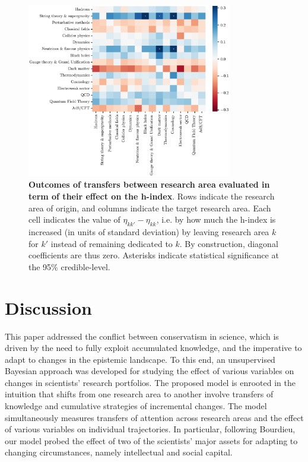 \documentclass{article}
\begin{document}
\begin{figure}[h]
    \centering
    \includegraphics[width=0.8\textwidth]{plots/outcomes_rho.eps}
    \caption{\textbf{Outcomes of transfers between research area evaluated in term of their effect on the h-index}. Rows indicate the research area of origin, and columns indicate the target research area. Each cell indicates the value of $\eta_{kk'}-\eta_{kk}$, i.e. by how much the h-index is increased (in units of standard deviation) by leaving research area $k$ for $k'$ instead of remaining dedicated to $k$. By construction, diagonal coefficients are thus zero. Asterisks indicate statistical significance at the 95\% credible-level. }
    \label{fig:outcomes_rho}
\end{figure}

\section{Discussion}

This paper addressed the conflict between conservatism in science, which is driven by the need to fully exploit accumulated knowledge, and the imperative to adapt to changes in the epistemic landscape. To this end, an unsupervised Bayesian approach was developed for studying the effect of various variables on changes in scientists' research portfolios. The proposed model is enrooted in the intuition that shifts from one research area to another involve transfers of knowledge and cumulative strategies of incremental changes. The model simultaneously measures transfers of attention across research areas and the effect of various variables on individual trajectories. In particular, following Bourdieu, our model probed the effect of two of the scientists' major assets for adapting to changing circumstances, namely intellectual and social capital.
\end{document}
